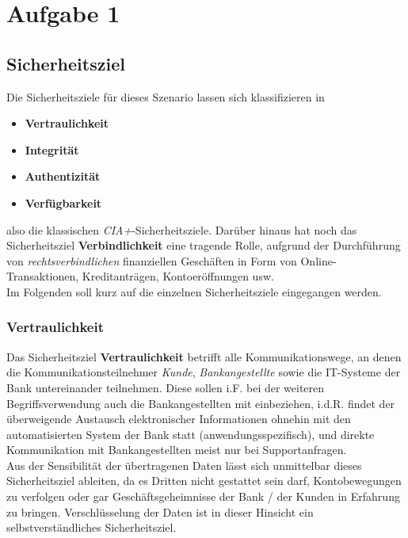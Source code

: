 \chapter{Aufgabe 1}


\section{Sicherheitsziel}

Die Sicherheitsziele für dieses Szenario lassen sich klassifizieren in

\begin{itemize}
    \itemsep0.5em
    \item \textbf{Vertraulichkeit}
    \item \textbf{Integrität}
    \item \textbf{Authentizität}
    \item \textbf{Verfügbarkeit}
\end{itemize}

\noindent
also die klassischen \textit{CIA+}-Sicherheitsziele.
Darüber hinaus hat noch das Sicherheitsziel \textbf{Verbindlichkeit} eine tragende Rolle, aufgrund der Durchführung von \textit{rechtsverbindlichen} finanziellen Geschäften in Form von Online-Transaktionen, Kreditanträgen, Kontoeröffnungen usw.\\

\noindent
Im Folgenden soll kurz auf die einzelnen Sicherheitsziele eingegangen werden.

\subsection{Vertraulichkeit}
Das Sicherheitsziel \textbf{Vertraulichkeit} betrifft alle Kommunikationswege, an denen die Kommunikationsteilnehmer \textit{Kunde}, \textit{Bankangestellte} sowie die IT-Systeme der Bank untereinander teilnehmen. Diese sollen i.F. bei der weiteren Begriffsverwendung auch die Bankangestellten mit einbeziehen, i.d.R. findet der überweigende Austausch elektronischer Informationen ohnehin mit den automatisierten System der Bank statt (anwendungsspezifisch), und direkte Kommunikation mit Bankangestellten meist nur bei Supportanfragen.\\
Aus der Sensibilität der übertragenen Daten lässt sich unmittelbar dieses Sicherheitsziel ableiten, da es Dritten nicht gestattet sein darf, Kontobewegungen zu verfolgen oder gar Geschäftsgeheimnisse der Bank / der Kunden in Erfahrung zu bringen. Verschlüsselung der Daten ist in dieser Hinsicht ein selbstverständliches Sicherheitsziel.

